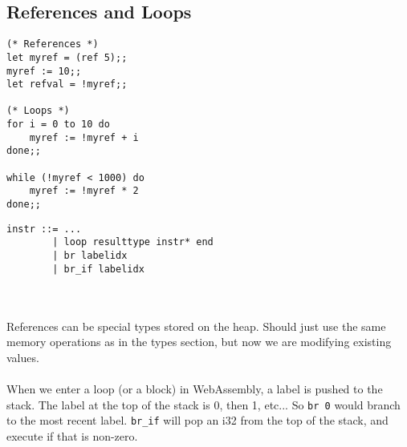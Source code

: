 \documentclass{report}
\newcommand{\textinline}{\texttt}
\begin{document}
\subsection{References and Loops}
\begin{minipage}{0.4\linewidth}
\begin{verbatim}
(* References *)
let myref = (ref 5);;
myref := 10;;
let refval = !myref;;

(* Loops *)
for i = 0 to 10 do
    myref := !myref + i
done;;

while (!myref < 1000) do
    myref := !myref * 2
done;;
\end{verbatim}
\end{minipage}  
\begin{minipage}{0.6\linewidth}
\begin{verbatim}
instr ::= ...
        | loop resulttype instr* end
        | br labelidx
        | br_if labelidx
\end{verbatim}
\end{minipage}
\\\\
References can be special types stored on the heap. Should just use the same memory operations as in the types section, but now we are modifying existing values.
\\\\
When we enter a loop (or a block) in WebAssembly, a label is pushed to the stack. The label at the top of the stack is 0, then 1, etc... So \textinline{br 0} would branch to the most recent label. \textinline{br_if} will pop an i32 from the top of the stack, and execute if that is non-zero.

\end{document}

